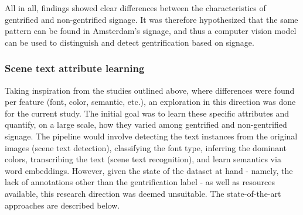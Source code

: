 All in all, findings showed clear differences between the characteristics of gentrified and non-gentrified signage. It was therefore hypothesized that the same pattern can be found in Amsterdam's signage, and thus a computer vision model can be used to distinguish and detect gentrification based on signage.

\subsubsection{Scene text attribute learning}

Taking inspiration from the studies outlined above, where differences were found per feature (font, color, semantic, etc.), an exploration in this direction was done for the current study. The initial goal was to learn these specific attributes and quantify, on a large scale, how they varied among gentrified and non-gentrified signage. The pipeline would involve detecting the text instances from the original images (scene text detection), classifying the font type, inferring the dominant colors, transcribing the text (scene text recognition), and learn semantics via word embeddings. However, given the state of the dataset at hand - namely, the lack of annotations other than the gentrification label - as well as resources available, this research direction was deemed unsuitable. The state-of-the-art approaches are described below.

